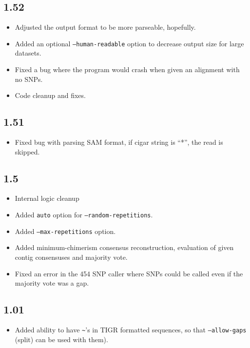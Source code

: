 \documentclass[11pt]{llncs}
\begin{document}
	  \subsection*{1.52}
\begin{itemize}	  
\item Adjusted the output format to be more parseable, hopefully.
\item Added an optional \texttt{--human-readable} option to decrease output size for large datasets.
\item Fixed a bug where the program would crash when given an alignment with no SNPs.
\item Code cleanup and fixes.
\end{itemize}

	\subsection*{1.51}
\begin{itemize}
\item Fixed bug with parsing SAM format, if cigar string is ``*'', the read is skipped.
\end{itemize}

	\subsection*{1.5}
\begin{itemize}
\item Internal logic cleanup
\item Added \texttt{auto} option for \texttt{--random-repetitions}. 
\item Added \texttt{--max-repetitions} option.
\item Added minimum-chimerism consensus reconstruction, evaluation of given contig consensuses and majority vote.
\item Fixed an error in the 454 SNP caller where SNPs could be called even if the majority vote was a gap.
\end{itemize}

	\subsection*{1.01}
\begin{itemize}
\item Added ability to have \texttt{\~}'s in TIGR formatted sequences, so that \texttt{--allow-gaps} (split) can be used with them).
\end{itemize}
\end{document}
